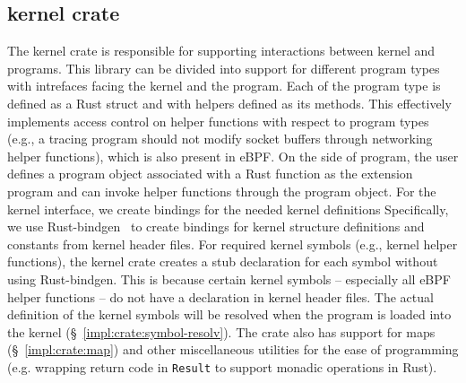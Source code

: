 \subsection{\projname{} kernel crate}

The \projname{} kernel crate is responsible for supporting interactions between
    kernel and \projname{} programs.
This library can be divided into support for different program types with
    intrefaces facing the kernel and the \projname{} program.
Each of the program type is defined as a Rust struct and with helpers defined
    as its methods.
This effectively implements access control on helper functions with respect to
    program types (e.g., a tracing program should not modify socket buffers
    through networking helper functions), which is also present in eBPF.
On the side of \projname{} program, the user defines a program object
    associated with a Rust function as the extension program and can invoke
    helper functions through the program object.
For the kernel interface, we create bindings for the needed kernel definitions
Specifically, we use Rust-bindgen~\cite{bindgen} to create bindings for kernel
    structure definitions and constants from kernel header files.
For required kernel symbols (e.g., kernel helper functions), the kernel crate
    creates a stub declaration for each symbol without using Rust-bindgen.
This is because certain kernel symbols -- especially all eBPF helper
    functions --  do not have a declaration in kernel header files.
The actual definition of the kernel symbols will be resolved when the program
    is loaded into the kernel (\S~\ref{impl:crate:symbol-resolv}).
The crate also has support for maps (\S~\ref{impl:crate:map}) and other
    miscellaneous utilities for the ease of programming (e.g. wrapping return
    code in \texttt{Result} to support monadic operations in Rust).

